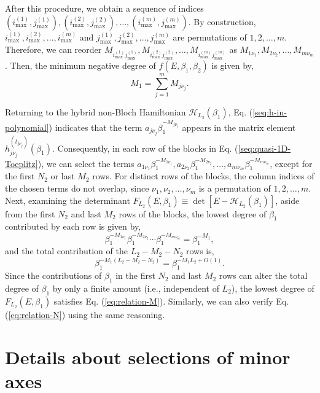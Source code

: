 \documentclass[pdflatex,sn-nature, iicol]{sn-jnl}%
\theoremstyle{thmstyleone}%
\theoremstyle{thmstyletwo}%
\theoremstyle{thmstylethree}%
\begin{document}
After this procedure, we obtain a sequence of indices $(i_{\max}^{(1)},j_{\max}^{(1)}),(i_{\max}^{(2)},j_{\max}^{(2)}),\dots,(i_{\max}^{(m)},j_{\max}^{(m)})$.
By construction, $i_{\max}^{(1)},i_{\max}^{(2)},\dots,i_{\max}^{(m)}$
and $j_{\max}^{(1)},j_{\max}^{(2)},\dots,j_{\max}^{(m)}$ are permutations
of $1,2,\dots,m$. Therefore, we can reorder $M_{i_{\max}^{(1)}j_{\max}^{(1)}},M_{i_{\max}^{(2)}j_{\max}^{(2)}},\dots,M_{i_{\max}^{(m)}j_{\max}^{(m)}}$
as $M_{1\nu_{1}},M_{2\nu_{2}},\dots,M_{m\nu_{m}}$. Then, the minimum
negative degree of $f(E,\beta_{1},\beta_{2})$ is given by, 
\begin{equation}
M_{1}=\sum_{j=1}^{m}M_{j\nu_{j}}.
\end{equation}

Returning to the hybrid non-Bloch Hamiltonian $\mathcal{H}_{L_{2}}(\beta_{1})$,
Eq. (\ref{seq:h-in-polynomial}) indicates that the term $a_{j\nu_{j}}\beta_{1}^{-M_{j\nu_{j}}}$
appears in the matrix element $h_{j\nu_{j}}^{(t_{j\nu_{j}})}(\beta_{1})$.
Consequently, in each row of the blocks in Eq. (\ref{seq:quasi-1D-Toeplitz}),
we can select the terms $a_{1\nu_{1}}\beta_{1}^{-M_{1\nu_{1}}},a_{2\nu_{2}}\beta_{1}^{-M_{2\nu_{2}}},\dots,a_{m\nu_{m}}\beta_{1}^{-M_{m\nu_{m}}}$,
except for the first $N_{2}$ or last $M_{2}$ rows. For distinct
rows of the blocks, the column indices of the chosen terms do not
overlap, since $\nu_{1},\nu_{2},\dots,\nu_{m}$ is a permutation of
$1,2,\dots,m$. Next, examining the determinant $F_{L_{2}}(E,\beta_{1})\equiv\det[E-\mathcal{H}_{L_{2}}(\beta_{1})]$,
aside from the first $N_{2}$ and last $M_{2}$ rows of the blocks,
the lowest degree of $\beta_{1}$ contributed by each row is given
by, 
\[
\beta_{1}^{-M_{1\nu_{1}}}\beta_{1}^{-M_{2\nu_{2}}}\cdots\beta_{1}^{-M_{m\nu_{m}}}=\beta_{1}^{-M_{1}},
\]
and the total contribution of the $L_{2}-M_{2}-N_{2}$ rows is, 
\[
\beta_{1}^{-M_{1}\left(L_{2}-M_{2}-N_{2}\right)}=\beta_{1}^{-M_{1}L_{2}+O(1)}.
\]
Since the contributions of $\beta_{1}$ in the first $N_{2}$ and
last $M_{2}$ rows can alter the total degree of $\beta_{1}$ by only
a finite amount (i.e., independent of $L_{2}$), the lowest degree
of $F_{L_{2}}(E,\beta_{1})$ satisfies Eq. (\ref{eq:relation-M}).
Similarly, we can also verify Eq. (\ref{eq:relation-N}) using the
same reasoning.

\pagebreak
\section{Details about selections of minor axes}
\end{document}
